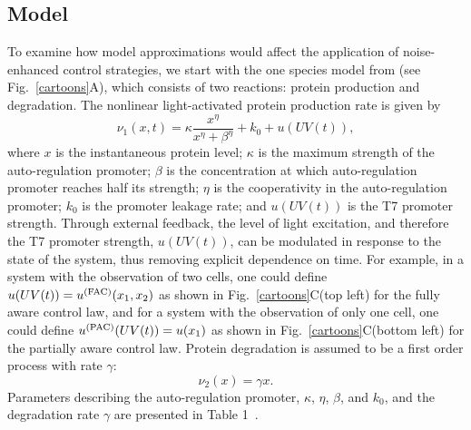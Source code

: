 \documentclass[12pt]{article}
\begin{document}
\subsection{Model}
To examine how model approximations would affect the application of noise-enhanced control strategies, we start with the one species model from \cite{May2021} (see Fig.\ \ref{cartoons}A), which consists of two reactions: protein production and degradation.  The nonlinear light-activated protein production rate is given by
 \begin{equation}
\nu_1(x,t)= \kappa\frac{x^\eta}{x^\eta+\beta^\eta}+ k_0 + u(UV(t)),
\label{prodRate}
\end{equation}
%
%
where $x$ is the instantaneous protein level; $\kappa$ is the maximum strength of the auto-regulation promoter; $\beta$ is the concentration at which auto-regulation promoter reaches half its strength; $\eta$ is the cooperativity in the auto-regulation promoter; $k_0$ is the promoter leakage rate; and $u(UV(t))$ is the T7 promoter strength. Through external feedback, the level of light excitation, and therefore the T7 promoter strength, $u(UV(t))$, can be modulated in response to the state of the system, thus removing explicit dependence on time. For example, in a system with the observation of two cells, one could define $u(UV(t)) = u^{\rm (FAC)}(x_1,x_2)$ as shown in Fig.\ \ref{cartoons}C(top left) for the fully aware control law, and for a system with the observation of only one cell, one could define $u^{\rm (PAC)}(UV(t)) = u(x_1)$ as shown in Fig.\ \ref{cartoons}C(bottom left) for the partially aware control law. Protein degradation is assumed to be a first order process with rate $\gamma$:
\begin{equation}
\nu_2(x) = \gamma x.
\end{equation}
Parameters describing the auto-regulation promoter, $\kappa$, $\eta$, $\beta$, and $k_0$, and the degradation rate $\gamma$
are presented in Table 1~\cite{May2021}. 
\end{document}
